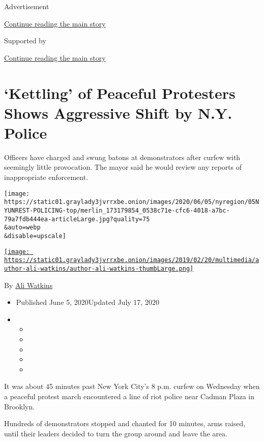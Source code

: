 Advertisement

\protect\hyperlink{after-top}{Continue reading the main story}

Supported by

\protect\hyperlink{after-sponsor}{Continue reading the main story}

\hypertarget{kettling-of-peaceful-protesters-shows-aggressive-shift-by-ny-police}{%
\section{`Kettling' of Peaceful Protesters Shows Aggressive Shift by
N.Y.
Police}\label{kettling-of-peaceful-protesters-shows-aggressive-shift-by-ny-police}}

Officers have charged and swung batons at demonstrators after curfew
with seemingly little provocation. The mayor said he would review any
reports of inappropriate enforcement.

\texttt{[image: https://static01.graylady3jvrrxbe.onion/images/2020/06/05/nyregion/05NYUNREST-POLICING-top/merlin\_173179854\_0538c71e-cfc6-4018-a7bc-79a7fdb444ea-articleLarge.jpg?quality=75\\\&auto=webp\\\&disable=upscale]}

\href{https://www.nytimes3xbfgragh.onion/by/ali-watkins}{\texttt{[image: https://static01.graylady3jvrrxbe.onion/images/2019/02/20/multimedia/author-ali-watkins/author-ali-watkins-thumbLarge.png]}}

By \href{https://www.nytimes3xbfgragh.onion/by/ali-watkins}{Ali Watkins}

\begin{itemize}
\item
  Published June 5, 2020Updated July 17, 2020
\item
  \begin{itemize}
  \item
  \item
  \item
  \item
  \item
  \end{itemize}
\end{itemize}

It was about 45 minutes past New York City's 8 p.m. curfew on Wednesday
when a peaceful protest march encountered a line of riot police near
Cadman Plaza in Brooklyn.

Hundreds of demonstrators stopped and chanted for 10 minutes, arms
raised, until their leaders decided to turn the group around and leave
the area.

